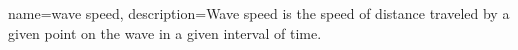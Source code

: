  {
    name=wave speed,
    description={Wave speed is the speed of distance traveled by a given point on the wave in a given interval of time.}
}
